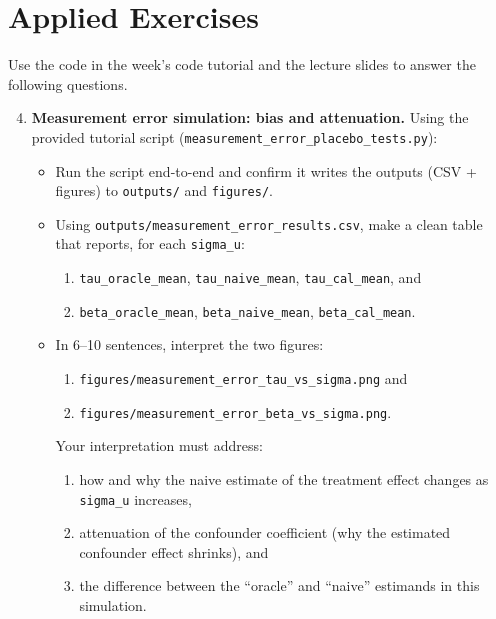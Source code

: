 \documentclass[11pt]{article}
\begin{document}
\section*{Applied Exercises}
Use the code in the week's code tutorial and the lecture slides to answer the following questions.\bigskip

  \begin{enumerate}
\setcounter{enumi}{3}

\item \textbf{Measurement error simulation: bias and attenuation.}
Using the provided tutorial script (\texttt{measurement\_error\_placebo\_tests.py}):
\begin{itemize}
  \item Run the script end-to-end and confirm it writes the outputs (CSV + figures) to \texttt{outputs/} and \texttt{figures/}.
  \item Using \texttt{outputs/measurement\_error\_results.csv}, make a clean table that reports, for each \texttt{sigma\_u}:
  \begin{enumerate}
    \item \texttt{tau\_oracle\_mean}, \texttt{tau\_naive\_mean}, \texttt{tau\_cal\_mean}, and
    \item \texttt{beta\_oracle\_mean}, \texttt{beta\_naive\_mean}, \texttt{beta\_cal\_mean}.
  \end{enumerate}
  \item In 6--10 sentences, interpret the two figures:
  \begin{enumerate}
    \item \texttt{figures/measurement\_error\_tau\_vs\_sigma.png} and
    \item \texttt{figures/measurement\_error\_beta\_vs\_sigma.png}.
  \end{enumerate}
  Your interpretation must address:
  \begin{enumerate}
    \item how and why the naive estimate of the treatment effect changes as \texttt{sigma\_u} increases,
    \item attenuation of the confounder coefficient (why the estimated confounder effect shrinks), and
    \item the difference between the ``oracle'' and ``naive'' estimands in this simulation.
  \end{enumerate}
\end{itemize}


\end{enumerate}
\end{document}

